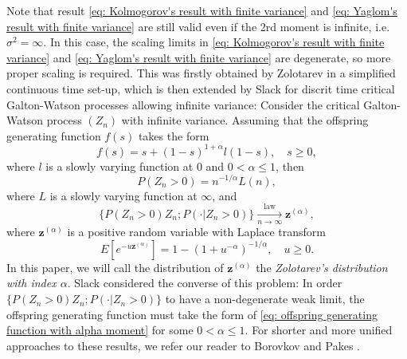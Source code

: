 \documentclass[12pt, a4paper]{amsart}
\theoremstyle{definition}
\numberwithin{equation}{section}
\begin{document}
	Note that result \eqref{eq: Kolmogorov's result with finite variance} and \eqref{eq: Yaglom's result with finite variance} are still valid even if the 2rd moment is infinite, i.e. $\sigma^2 = \infty$. 
	In this case, the scaling limits in \eqref{eq: Kolmogorov's result with finite variance} and \eqref{eq: Yaglom's result with finite variance} are degenerate, so more proper scaling is required.
	This was firstly obtained by Zolotarev \cite{Zolotarev1957More} in a simplified continuous time set-up,
	which is then extended by Slack \cite{Slack1968A-branching} for discrit time critical Galton-Watson processes allowing infinite variance:  Consider the critical Galton-Watson process $(Z_n)$ with infinite variance. 
	Assuming that the offspring generating function $f(s)$ takes the form
\[\label{eq: offspring generating function with alpha moment}
	f(s) 
	= s + (1-s)^{1+ \alpha} l(1-s), 
	\quad s\geq 0,
\]
	where $l$ is a slowly varying function at $0$ and $0 < \alpha \leq 1$, then
\[ \label{eq: extinction probability of critical GW process without 2rd moment}
	P(Z_n > 0) = n^{-1/\alpha} L(n),
\]
	where $L$ is a slowly varying function at $\infty$, and
\[\label{eq: conditional distribution of critical GW process without 2rd moment}
	\big\{ P(Z_n > 0) Z_n; P(\cdot | Z_n > 0)\big\}
	\xrightarrow[n\to \infty]{\operatorname{law}} \mathbf z^{(\alpha)},
\]
	where $\mathbf z^{(\alpha)}$ is a positive random variable with Laplace transform
\[
	E[e^{- u \mathbf z^{(\alpha)}}]  
	= 1 - (1+ u^{-\alpha})^{-1/\alpha}, 
	\quad u \geq 0.
\]
	In this paper, we will call the distribution of $\mathbf z^{(\alpha)}$ the \emph{Zolotarev's distribution with index $\alpha$}.
	Slack \cite{Slack1972Further} considered the converse of this problem: 
	In order $\big\{ P(Z_n > 0) Z_n; P(\cdot | Z_n > 0)\big\}$ to have a non-degenerate weak limit, the offspring generating function must take the form of \eqref{eq: offspring generating function with alpha moment} for some $0 < \alpha \leq 1$.
	For shorter and more unified approaches to these results, we refer our reader to Borovkov \cite{Borovkov1989Method} and Pakes \cite{Pakes2010Critical}.
\end{document}
